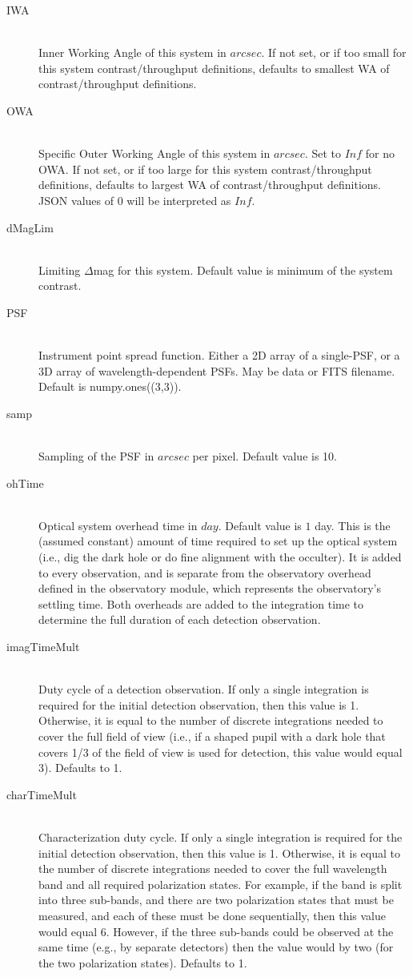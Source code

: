 \documentclass[cleanfoot]{asme2ej}
\begin{document}
\begin{itemize}
\begin{description}
\begin{description}
    \item[IWA] \hfill \\
     Inner Working Angle of this system in $ arcsec $. If not set, or if too small for this system contrast/throughput definitions, defaults to smallest WA of contrast/throughput definitions.
    \item[OWA] \hfill \\
    Specific Outer Working Angle of this system in $ arcsec $. Set to $ Inf $ for no OWA. If not set, or if too large for this system contrast/throughput definitions, defaults to largest WA of contrast/throughput definitions.  JSON values of $ 0 $ will be interpreted as $ Inf $.
    \item[dMagLim] \hfill \\
    Limiting $ \Delta$mag for this system. Default value is minimum of the system contrast.
    \item[PSF] \hfill \\
    Instrument point spread function. Either a 2D array of a single-PSF, or a 3D array of wavelength-dependent PSFs. May be data or FITS filename. Default is numpy.ones((3,3)).
    \item[samp] \hfill \\
    Sampling of the PSF in $ arcsec $ per pixel. Default value is 10.
    \item[ohTime] \hfill \\
    Optical system overhead time in $ day $.  Default value is $ 1 $ day.  This is the (assumed constant) amount of time required to set up the optical system (i.e., dig the dark hole or do fine alignment with the occulter).  It is added to every observation, and is separate from the observatory overhead defined in the observatory module, which represents the observatory's settling time.  Both overheads are added to the integration time to determine the full duration of each detection observation.
    \item[imagTimeMult]\hfill \\
    Duty cycle of a detection observation.  If only a single integration is required for the initial detection observation, then this value is 1.  Otherwise, it is equal to the number of discrete integrations needed to cover the full field of view (i.e., if a shaped pupil with a dark hole that covers 1/3 of the field of view is used for detection, this value would equal 3).  Defaults to 1.
    \item[charTimeMult]\hfill \\
    Characterization duty cycle.  If only a single integration is required for the initial detection observation, then this value is 1.  Otherwise, it is equal to the number of discrete integrations needed to cover the full wavelength band and all required polarization states.  For example, if the band is split into three sub-bands, and there are two polarization states that must be measured, and each of these must be done sequentially, then this value would equal 6.  However, if the three sub-bands could be observed at the same time (e.g., by separate detectors) then the value would by two (for the two polarization states). Defaults to 1.

\end{description}
\end{description}
\end{itemize}
\end{document}
